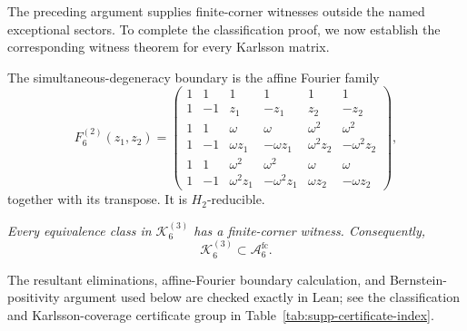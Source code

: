 \documentclass[aps,prx,reprint,nofootinbib,twoside,superscriptaddress,longbibliography,floatfix]{revtex4-2}
\theoremstyle{definition}
\newcommand{\KK}{\mathcal K}
\newcommand{\FCAtlas}{\mathcal A}
\begin{document}
The preceding argument supplies finite-corner witnesses outside the named exceptional sectors. To complete the classification proof, we now establish the corresponding witness theorem for every Karlsson matrix.

The simultaneous-degeneracy boundary is the affine Fourier family
\begin{equation}
F_6^{(2)}(z_1,z_2)=
\begin{pmatrix}
1&1&1&1&1&1\\
1&-1&z_1&-z_1&z_2&-z_2\\
1&1&\omega&\omega&\omega^2&\omega^2\\
1&-1&\omega z_1&-\omega z_1&\omega^2z_2&-\omega^2z_2\\
1&1&\omega^2&\omega^2&\omega&\omega\\
1&-1&\omega^2z_1&-\omega^2z_1&\omega z_2&-\omega z_2
\end{pmatrix},
\label{eq:supp-fourier-family}
\end{equation}
together with its transpose. It is $H_2$-reducible.

{\emph{Every equivalence class in $\KK_6^{(3)}$ has a finite-corner witness. Consequently,}}
\begin{equation}
{\KK_6^{(3)}\subset\FCAtlas_6^{\mathrm{fc}}.}
\label{eq:supp-full-karlsson-containment}
\end{equation}

{The resultant eliminations, affine-Fourier boundary calculation, and Bernstein-positivity argument used below are checked exactly in Lean; see the classification and Karlsson-coverage certificate group in Table~\ref{tab:supp-certificate-index}.}
\end{document}
